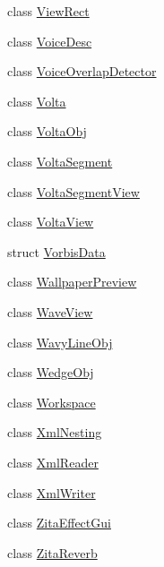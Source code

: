\begin{DoxyCompactItemize}
\item 
class \hyperlink{class_ms_1_1_view_rect}{View\+Rect}
\item 
class \hyperlink{class_ms_1_1_voice_desc}{Voice\+Desc}
\item 
class \hyperlink{class_ms_1_1_voice_overlap_detector}{Voice\+Overlap\+Detector}
\item 
class \hyperlink{class_ms_1_1_volta}{Volta}
\item 
class \hyperlink{class_ms_1_1_volta_obj}{Volta\+Obj}
\item 
class \hyperlink{class_ms_1_1_volta_segment}{Volta\+Segment}
\item 
class \hyperlink{class_ms_1_1_volta_segment_view}{Volta\+Segment\+View}
\item 
class \hyperlink{class_ms_1_1_volta_view}{Volta\+View}
\item 
struct \hyperlink{struct_ms_1_1_vorbis_data}{Vorbis\+Data}
\item 
class \hyperlink{class_ms_1_1_wallpaper_preview}{Wallpaper\+Preview}
\item 
class \hyperlink{class_ms_1_1_wave_view}{Wave\+View}
\item 
class \hyperlink{class_ms_1_1_wavy_line_obj}{Wavy\+Line\+Obj}
\item 
class \hyperlink{class_ms_1_1_wedge_obj}{Wedge\+Obj}
\item 
class \hyperlink{class_ms_1_1_workspace}{Workspace}
\item 
class \hyperlink{class_ms_1_1_xml_nesting}{Xml\+Nesting}
\item 
class \hyperlink{class_ms_1_1_xml_reader}{Xml\+Reader}
\item 
class \hyperlink{class_ms_1_1_xml_writer}{Xml\+Writer}
\item 
class \hyperlink{class_ms_1_1_zita_effect_gui}{Zita\+Effect\+Gui}
\item 
class \hyperlink{class_ms_1_1_zita_reverb}{Zita\+Reverb}
\end{DoxyCompactItemize}
